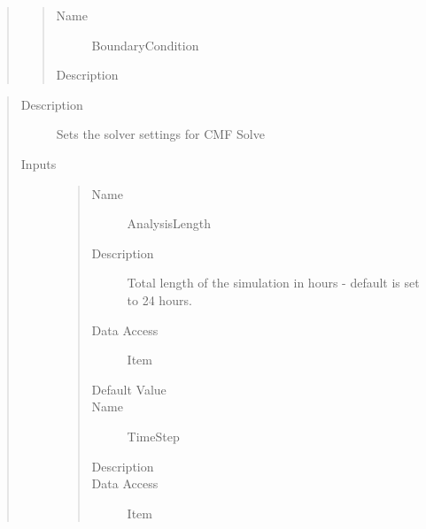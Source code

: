 \documentclass[letterpaper,10pt,english]{sphinxmanual}
\begin{document}
\begin{quote}
\begin{description}
\begin{quote}
\begin{description}
\item[{Name}] \leavevmode
BoundaryCondition

\item[{Description}] \leavevmode
{}

\end{description}\end{quote}

\end{description}\end{quote}

\begin{quote}\begin{description}
\item[{Description}] \leavevmode
Sets the solver settings for CMF Solve

\item[{Inputs}] \leavevmode\begin{quote}\begin{description}
\item[{Name}] \leavevmode
AnalysisLength

\item[{Description}] \leavevmode
Total length of the simulation in hours - default is set to 24 hours.

\item[{Data Access}] \leavevmode
Item

\item[{Default Value}] \leavevmode
{}

\item[{Name}] \leavevmode
TimeStep

\item[{Description}] \leavevmode
{}

\item[{Data Access}] \leavevmode
Item


\end{description}
\end{quote}
\end{description}
\end{quote}
\end{document}
